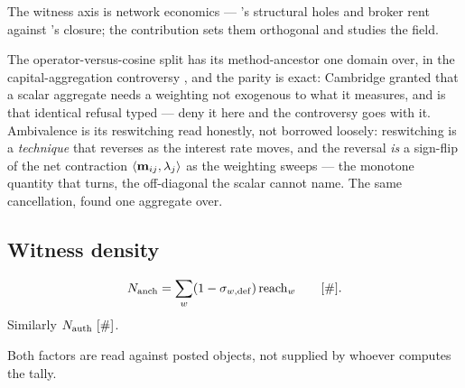 \documentclass[../main]{subfiles}
\begin{document}
\begin{econ}[label=e:witness, title={Structural holes versus closure}, ref=f:eff,
  cites={a:burt,a:coleman}, departs=flatten,
  stopsat={one axis (broker rent) where the field needs two (rent and density)}]
  The witness axis is network economics --- \textcite{a:burt}'s structural holes and broker
  rent against \textcite{a:coleman}'s closure; the contribution sets them orthogonal and
  studies the field.
\end{econ}

\begin{econ}[label=e:capital, title={Reswitching as honest ambivalence}, ref=op:cos,
  cites={a:capital}, departs=scalar,
  stopsat={a scalar aggregate needs a weighting not exogenous to what it measures}]
  The operator-versus-cosine split has its method-ancestor one domain over, in the
  capital-aggregation controversy \parencite{a:capital}, and the parity is exact: Cambridge
  granted that a scalar aggregate needs a weighting not exogenous to what it measures, and
   is that identical refusal typed --- deny it here and the controversy goes
  with it. Ambivalence is its reswitching read honestly, not borrowed loosely: reswitching
  is a \emph{technique} that reverses as the interest rate moves, and the reversal \emph{is}
  a sign-flip of the net contraction $\langle \mathbf{m}\sb{ ij } , \lambda\sb{j} \rangle$ as the weighting sweeps ---
  the monotone quantity that turns, the off-diagonal the scalar cannot name. The same
  cancellation, found one aggregate over.
\end{econ}

\subsection{Witness density}
\label{subsec:ont:density}
%
\begin{definition}
  \begin{equation}
    N\sb{\mathrm{anch}}=
    \sum_w(1-\sigma\sb{w,\mathrm{def}})\operatorname{reach}_w
    \qquad [\#].
    \label{eq:f:Ncount}
  \end{equation}
  Similarly $N\sb{\mathrm{auth}}\ [\#]$.
\end{definition}

Both factors are read against posted objects, not supplied by whoever computes the tally.
\end{document}
